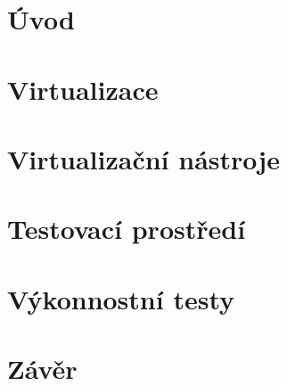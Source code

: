 \chapter{Úvod}


\chapter{Virtualizace}


\chapter{Virtualizační nástroje}


\chapter{Testovací prostředí}


\chapter{Výkonnostní testy}


\chapter{Závěr}

